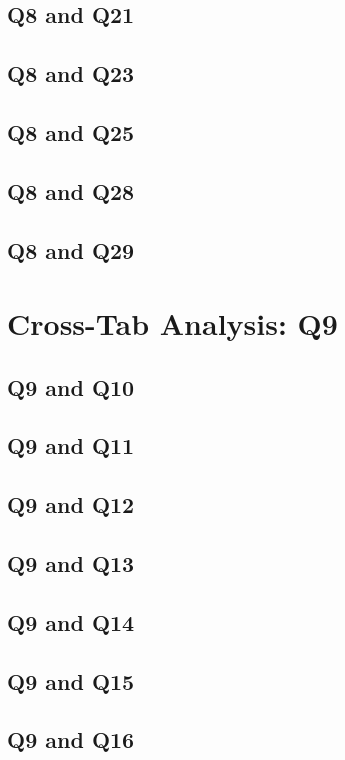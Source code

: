 \documentclass{report}
\begin{document}
\section{Q8 and Q21}\clearpage
\section{Q8 and Q23}\clearpage
\section{Q8 and Q25}\clearpage
\section{Q8 and Q28}\clearpage
\section{Q8 and Q29}\clearpage

\chapter{Cross-Tab Analysis: Q9}

\section{Q9 and Q10}\clearpage
\section{Q9 and Q11}\clearpage
\section{Q9 and Q12}\clearpage
\section{Q9 and Q13}\clearpage
\section{Q9 and Q14}\clearpage
\section{Q9 and Q15}\clearpage
\section{Q9 and Q16}\clearpage
\end{document}
